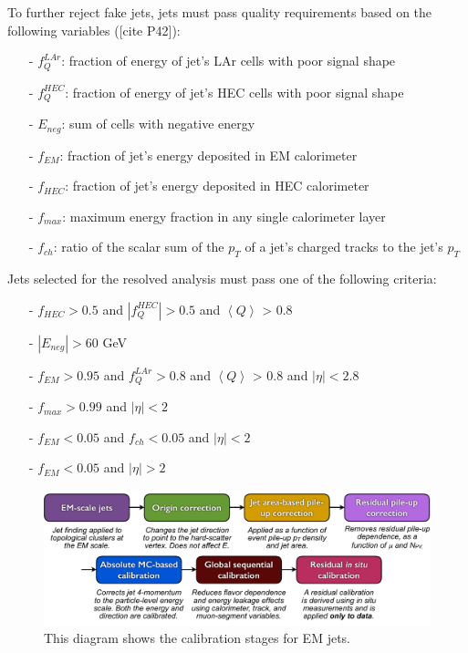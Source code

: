 To further reject fake jets, jets must pass quality requirements based on the following variables ([cite P42]):

\begin{itemize}
\item[-] $f_{Q}^{LAr}$: fraction of energy of jet's LAr cells with poor signal shape
\item[-] $f_{Q}^{HEC}$: fraction of energy of jet's HEC cells with poor signal shape
\item[-] $E_{neg}$: sum of cells with negative energy
\item[-] $f_{EM}$: fraction of jet's energy deposited in EM calorimeter
\item[-] $f_{HEC}$: fraction of jet's energy deposited in HEC calorimeter
\item[-] $f_{max}$: maximum energy fraction in any single calorimeter layer
\item[-] $f_{ch}$: ratio of the scalar sum of the $p_{T}$ of a jet's charged tracks to the jet's $p_{T}$
\end{itemize}

Jets selected for the resolved analysis must pass one of the following criteria:

\begin{itemize}
\item[-] $f_{HEC} > 0.5$ and $|f_{Q}^{HEC}| > 0.5$ and $\left\langle Q \right\rangle $ > 0.8
\item[-] $|E_{neg}| > 60$ GeV
\item[-] $f_{EM} > 0.95$ and $f_{Q}^{LAr} > 0.8$ and $\left\langle Q \right\rangle $ > 0.8 and $|\eta| < 2.8$
\item[-] $f_{max} > 0.99$ and $|\eta| < 2$
\item[-] $f_{EM} < 0.05$ and $f_{ch} < 0.05$ and $|\eta| < 2$
\item[-] $f_{EM} < 0.05$ and  $|\eta| > 2$
\end{itemize}



\begin{figure}[h!]
  \centering
  \includegraphics[width=\hsize]{figures/Analysis/jetcalib.pdf}
  \caption{\cite{jetcalib} This diagram shows the calibration stages for EM jets.} 
  \label{fig:jetcalib}
\end{figure} 
\FloatBarrier

